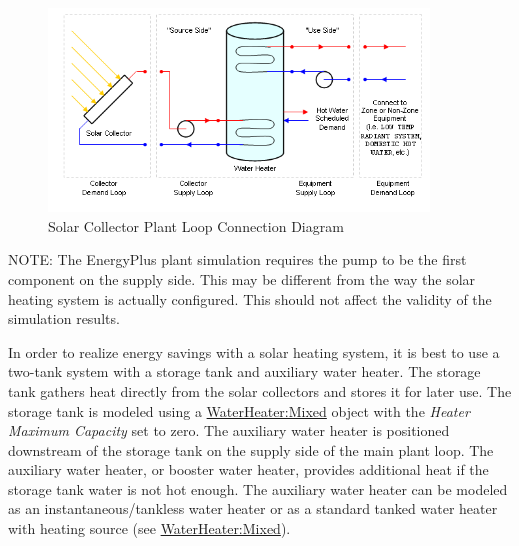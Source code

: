 \begin{figure}[hbtp] %
\centering
\includegraphics[width=0.9\textwidth, height=0.9\textheight, keepaspectratio=true]{media/image339.png}
\caption{Solar Collector Plant Loop Connection Diagram \protect \label{fig:solar-collector-plant-loop-connection-diagram}}
\end{figure}

NOTE: The EnergyPlus plant simulation requires the pump to be the first component on the supply side. This may be different from the way the solar heating system is actually configured. This should not affect the validity of the simulation results.

In order to realize energy savings with a solar heating system, it is best to use a two-tank system with a storage tank and auxiliary water heater. The storage tank gathers heat directly from the solar collectors and stores it for later use. The storage tank is modeled using a \hyperref[waterheatermixed]{WaterHeater:Mixed} object with the \emph{Heater Maximum Capacity} set to zero. The auxiliary water heater is positioned downstream of the storage tank on the supply side of the main plant loop. The auxiliary water heater, or booster water heater, provides additional heat if the storage tank water is not hot enough. The auxiliary water heater can be modeled as an instantaneous/tankless water heater or as a standard tanked water heater with heating source (see \hyperref[waterheatermixed]{WaterHeater:Mixed}).

